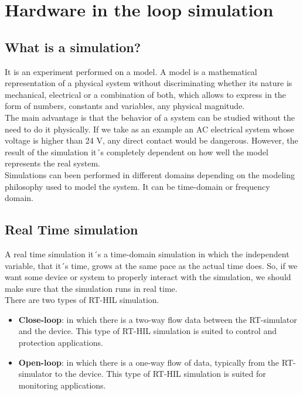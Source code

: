 \section{Hardware in the loop simulation}
\subsection{What is a simulation?}
It is an experiment performed on a model. A model is a mathematical representation of a physical system without discriminating whether its nature is mechanical, electrical or a combination of both, which allows to express in the form of numbers, constants and variables, any physical magnitude.\\
The main advantage is that the behavior of a system can be studied without the need to do it physically. If we take as an example an AC electrical system whose voltage is higher than 24 V, any direct contact would be dangerous. However, the result of the simulation it´s completely dependent on how well the model represents the real system.\\
Simulations can been performed in different domains depending on the modeling philosophy used to model the system. It can be time-domain or frequency domain.\cite{RTI}
\subsection{Real Time simulation}
A real time simulation it´s a time-domain simulation in which the independent variable, that it´s time, grows at the same pace as the actual time does. So, if we want some device or system to properly interact with the simulation, we should make sure that the simulation runs in real time.\\
There are two types of RT-HIL simulation.
\begin{itemize}
    \item \textbf{Close-loop}: in which there is a two-way flow data between the RT-simulator and the device. This type of RT-HIL simulation is suited to control and protection applications.
    \item \textbf{Open-loop}: in which there is a one-way flow of data, typically from the RT-simulator to the device. This type of RT-HIL simulation is suited for monitoring applications. 
\end{itemize}
